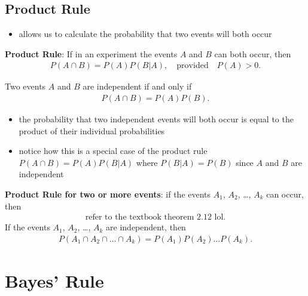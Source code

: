 \documentclass[10pt]{article}
\begin{document}
\subsection{Product Rule}
\begin{itemize}
    \item allows us to calculate the probability that two events will both occur
\end{itemize}
\begin{theorem}
    \textbf{Product Rule}: If in an experiment the events $A$ and $B$ can both occur, then
    \begin{align*}
        P(A \cap B) = P(A)P(B|A), \quad \text{provided} \quad P(A) > 0
    .\end{align*}
\end{theorem}
\begin{theorem}
    Two events $A$ and $B$ are independent if and only if
    \begin{align*}
        P(A \cap B) = P(A)P(B)
    .\end{align*}
    \begin{itemize}
        \item the probability that two independent events will both occur is equal to the product of their individual probabilities
        \item notice how this is a special case of the product rule $P(A \cap B) = P(A)P(B|A)$ where $P(B|A) = P(B)$ since $A$ and $B$ are independent
    \end{itemize}
\end{theorem}
\begin{theorem}
    \textbf{Product Rule for two or more events}: if the events $ A_1$, $ A_2$, \ldots, $A_k$ can occur, then
    \begin{align*}
        \text{refer to the textbook theorem 2.12 lol}
    .\end{align*}
    If the events $ A_1$, $ A_2$, \ldots, $A_k$ are independent, then
    \begin{align*}
        P(A_1 \cap A_2 \cap \ldots \cap A_k) = P(A_1)P(A_2)\ldots P(A_k)
    .\end{align*}
\end{theorem}



\section{Bayes' Rule}
\end{document}

